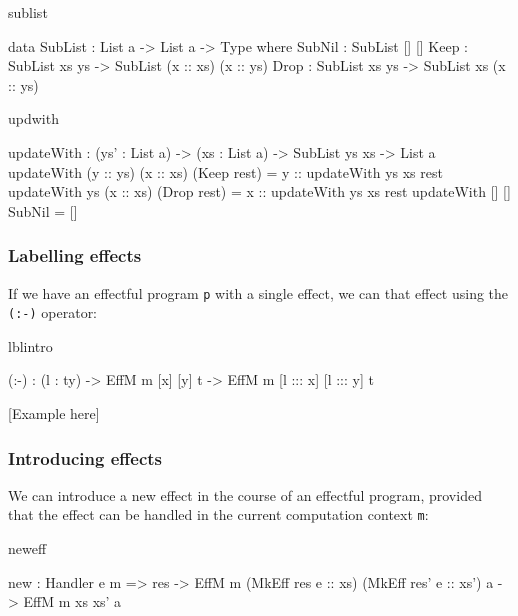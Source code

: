 \begin{SaveVerbatim}{sublist}

data SubList : List a -> List a -> Type where
     SubNil : SubList [] []
     Keep   : SubList xs ys -> 
              SubList (x :: xs) (x :: ys)
     Drop   : SubList xs ys -> 
              SubList xs (x :: ys)

\end{SaveVerbatim}

\begin{SaveVerbatim}{updwith}

updateWith : (ys' : List a) -> (xs : List a) ->
             SubList ys xs -> List a
updateWith (y :: ys) (x :: xs) (Keep rest) 
           = y :: updateWith ys xs rest
updateWith ys        (x :: xs) (Drop rest) 
           = x :: updateWith ys xs rest
updateWith []        []        SubNil      
           = []

\end{SaveVerbatim}

\subsubsection{Labelling effects}

If we have an effectful program \texttt{p} with a single effect, we can 
 that effect using the \texttt{(:-)} operator:

\begin{SaveVerbatim}{lblintro}

(:-)  : (l : ty) -> 
        EffM m [x] [y] t -> 
        EffM m [l ::: x] [l ::: y] t

\end{SaveVerbatim}

[Example here]

\subsubsection{Introducing effects}

We can introduce a new effect in the course of an effectful program, provided
that the effect can be handled in the current computation context \texttt{m}:

\begin{SaveVerbatim}{neweff}

new : Handler e m => res -> 
      EffM m (MkEff res e :: xs) 
             (MkEff res' e :: xs') a ->
      EffM m xs xs' a

\end{SaveVerbatim}

